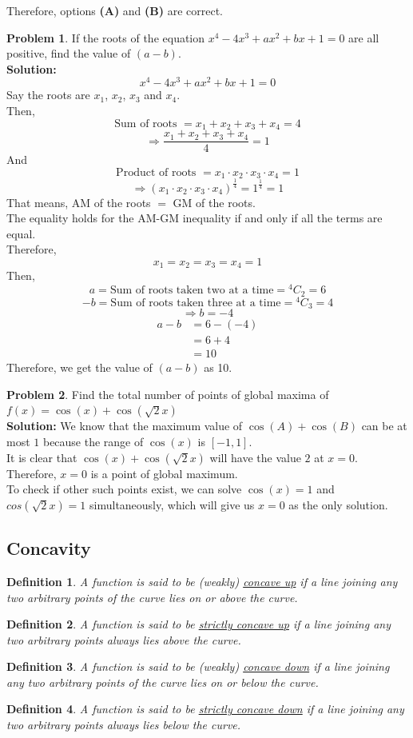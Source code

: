 \documentclass[14]{article}
\newtheorem{define}{Definition}
\theoremstyle{definition}
\newtheorem{prob}{Problem}
\theoremstyle{case}
\begin{document}
Therefore, options \textbf{(A)} and \textbf{(B)} are correct.
\pagebreak
\begin{prob}
If the roots of the equation $x^4 - 4x^3 + ax^2 + bx + 1 = 0$ are all positive, find the value of $(a - b)$.\\
\textbf{Solution: }
\[x^4 - 4x^3 + ax^2 + bx + 1 = 0\]
Say the roots are $x_1$, $x_2$, $x_3$ and $x_4$.\\
Then,
\[\text{Sum of roots } = x_1 + x_2 + x_3 + x_4 = 4\]
\[\Rightarrow \dfrac{x_1 + x_2 + x_3 + x_4}4 = 1\]
And
\[
\text{Product of roots } = x_1 \cdot x_2 \cdot x_3 \cdot x_4 = 1
\]
\[
\Rightarrow (x_1 \cdot x_2 \cdot x_3 \cdot x_4)^{\frac14} = 1^{\frac14} = 1
\]
That means, AM of the roots $=$ GM of the roots.\\
The equality holds for the AM-GM inequality if and only if all the terms are equal.\\
Therefore,
\[x_1 = x_2 = x_3 = x_4 = 1\]
Then,
\[
a = \text{Sum of roots taken two at a time} = {}^4C_2 = 6
\]
\[
-b = \text{Sum of roots taken three at a time} = {}^4C_3 = 4
\]
\[
\Rightarrow b = -4
\]
\begin{align*}
a - b &= 6 - (- 4)\\
&= 6 + 4\\
&= 10
\end{align*}
Therefore, we get the value of $(a - b)$ as 10.
\end{prob}
\pagebreak
\begin{prob}
Find the total number of points of global maxima of $ f(x) = \cos(x) + \cos(\sqrt{2} x)$\\
\textbf{Solution:}
We know that the maximum value of $\cos(A) + \cos(B)$ can be at most $1$ because the range of $\cos(x)$ is $[-1, 1]$.\\
It is clear that $\cos(x) + \cos(\sqrt2 x)$ will have the value $2$ at $x = 0$. Therefore, $x = 0$ is a point of global maximum.\\
To check if other such points exist, we can solve $\cos(x) = 1$ and $cos(\sqrt2 x) = 1$ simultaneously, which will give us $x = 0$ as the only solution.\\
\end{prob}
\subsection{Concavity}
\begin{define}
A function is said to be (weakly) \underline{concave up} if a line joining any two arbitrary points of the curve lies on or above the curve.
\end{define}
\begin{define}
A function is said to be \underline{strictly concave up} if a line joining any two arbitrary points always lies above the curve.
\end{define}
\begin{define}
A function is said to be (weakly) \underline{concave down} if a line joining any two arbitrary points of the curve lies on or below the curve.
\end{define}
\begin{define}
A function is said to be \underline{strictly concave down} if a line joining any two arbitrary points always lies below the curve.
\end{define}
\end{document}
